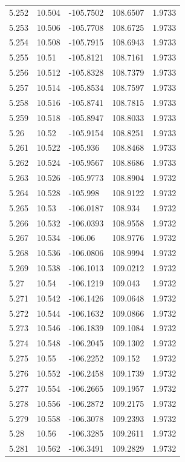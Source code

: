 \begin{tabular}{lllll}
5.252 & 10.504 & -105.7502 & 108.6507 & 1.9733 \\
5.253 & 10.506 & -105.7708 & 108.6725 & 1.9733 \\
5.254 & 10.508 & -105.7915 & 108.6943 & 1.9733 \\
5.255 & 10.51 & -105.8121 & 108.7161 & 1.9733 \\
5.256 & 10.512 & -105.8328 & 108.7379 & 1.9733 \\
5.257 & 10.514 & -105.8534 & 108.7597 & 1.9733 \\
5.258 & 10.516 & -105.8741 & 108.7815 & 1.9733 \\
5.259 & 10.518 & -105.8947 & 108.8033 & 1.9733 \\
5.26 & 10.52 & -105.9154 & 108.8251 & 1.9733 \\
5.261 & 10.522 & -105.936 & 108.8468 & 1.9733 \\
5.262 & 10.524 & -105.9567 & 108.8686 & 1.9733 \\
5.263 & 10.526 & -105.9773 & 108.8904 & 1.9732 \\
5.264 & 10.528 & -105.998 & 108.9122 & 1.9732 \\
5.265 & 10.53 & -106.0187 & 108.934 & 1.9732 \\
5.266 & 10.532 & -106.0393 & 108.9558 & 1.9732 \\
5.267 & 10.534 & -106.06 & 108.9776 & 1.9732 \\
5.268 & 10.536 & -106.0806 & 108.9994 & 1.9732 \\
5.269 & 10.538 & -106.1013 & 109.0212 & 1.9732 \\
5.27 & 10.54 & -106.1219 & 109.043 & 1.9732 \\
5.271 & 10.542 & -106.1426 & 109.0648 & 1.9732 \\
5.272 & 10.544 & -106.1632 & 109.0866 & 1.9732 \\
5.273 & 10.546 & -106.1839 & 109.1084 & 1.9732 \\
5.274 & 10.548 & -106.2045 & 109.1302 & 1.9732 \\
5.275 & 10.55 & -106.2252 & 109.152 & 1.9732 \\
5.276 & 10.552 & -106.2458 & 109.1739 & 1.9732 \\
5.277 & 10.554 & -106.2665 & 109.1957 & 1.9732 \\
5.278 & 10.556 & -106.2872 & 109.2175 & 1.9732 \\
5.279 & 10.558 & -106.3078 & 109.2393 & 1.9732 \\
5.28 & 10.56 & -106.3285 & 109.2611 & 1.9732 \\
5.281 & 10.562 & -106.3491 & 109.2829 & 1.9732 \\

\end{tabular}
